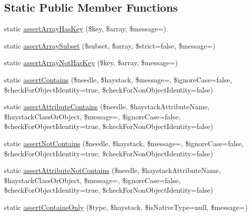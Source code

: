 \subsection*{Static Public Member Functions}
\begin{DoxyCompactItemize}
\item 
static \mbox{\hyperlink{class_p_h_p_unit___framework___assert_adac3de7f9d18aa19b6b06f46f0c204cc}{assert\+Array\+Has\+Key}} (\$key, \$array, \$message=\textquotesingle{}\textquotesingle{})
\item 
static \mbox{\hyperlink{class_p_h_p_unit___framework___assert_a851df6aef9b31def211ff390c0c249f5}{assert\+Array\+Subset}} (\$subset, \$array, \$strict=false, \$message=\textquotesingle{}\textquotesingle{})
\item 
static \mbox{\hyperlink{class_p_h_p_unit___framework___assert_a9d7f35f7e659c207ab1611413be8a743}{assert\+Array\+Not\+Has\+Key}} (\$key, \$array, \$message=\textquotesingle{}\textquotesingle{})
\item 
static \mbox{\hyperlink{class_p_h_p_unit___framework___assert_ada35214487ddfcc3dff687bf232a3c46}{assert\+Contains}} (\$needle, \$haystack, \$message=\textquotesingle{}\textquotesingle{}, \$ignore\+Case=false, \$check\+For\+Object\+Identity=true, \$check\+For\+Non\+Object\+Identity=false)
\item 
static \mbox{\hyperlink{class_p_h_p_unit___framework___assert_a455ab7413c72eff7b5cff87a9aa86082}{assert\+Attribute\+Contains}} (\$needle, \$haystack\+Attribute\+Name, \$haystack\+Class\+Or\+Object, \$message=\textquotesingle{}\textquotesingle{}, \$ignore\+Case=false, \$check\+For\+Object\+Identity=true, \$check\+For\+Non\+Object\+Identity=false)
\item 
static \mbox{\hyperlink{class_p_h_p_unit___framework___assert_a63309ec75a4778f05207e22be8c64f00}{assert\+Not\+Contains}} (\$needle, \$haystack, \$message=\textquotesingle{}\textquotesingle{}, \$ignore\+Case=false, \$check\+For\+Object\+Identity=true, \$check\+For\+Non\+Object\+Identity=false)
\item 
static \mbox{\hyperlink{class_p_h_p_unit___framework___assert_a1481dee730a5618436bddeacfaef80e1}{assert\+Attribute\+Not\+Contains}} (\$needle, \$haystack\+Attribute\+Name, \$haystack\+Class\+Or\+Object, \$message=\textquotesingle{}\textquotesingle{}, \$ignore\+Case=false, \$check\+For\+Object\+Identity=true, \$check\+For\+Non\+Object\+Identity=false)
\item 
static \mbox{\hyperlink{class_p_h_p_unit___framework___assert_a171246e394f46020b6bf97aa5455744f}{assert\+Contains\+Only}} (\$type, \$haystack, \$is\+Native\+Type=null, \$message=\textquotesingle{}\textquotesingle{})

\end{DoxyCompactItemize}
